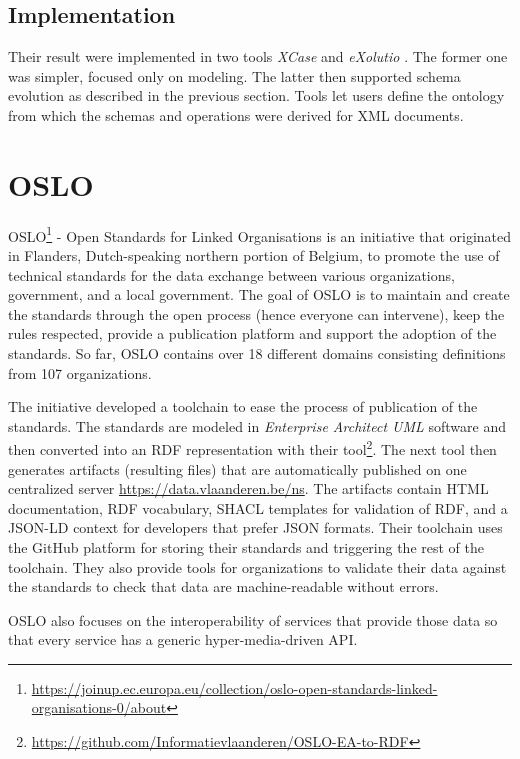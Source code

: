 \subsection{Implementation}

Their result were implemented in two tools \textit{XCase} \cite{xcase} and \textit{eXolutio} \cite{exolutio}. The former one was simpler, focused only on modeling. The latter then supported schema evolution as described in the previous section. Tools let users define the ontology from which the schemas and operations were derived for XML documents.

\section{OSLO}

OSLO\footnote{\url{https://joinup.ec.europa.eu/collection/oslo-open-standards-linked-organisations-0/about}} - Open Standards for Linked Organisations is an initiative that originated in Flanders, Dutch-speaking northern portion of Belgium, to promote the use of technical standards for the data exchange between various organizations, government, and a local government. The goal of OSLO is to maintain and create the standards through the open process (hence everyone can intervene), keep the rules respected, provide a publication platform and support the adoption of the standards. So far, OSLO contains over 18 different domains consisting definitions from 107 organizations.

The initiative developed a toolchain to ease the process of publication of the standards. The standards are modeled in \textit{Enterprise Architect UML} software and then converted into an RDF representation with their tool\footnote{\url{https://github.com/Informatievlaanderen/OSLO-EA-to-RDF}}. The next tool then generates artifacts (resulting files) that are automatically published on one centralized server \url{https://data.vlaanderen.be/ns}. The artifacts contain HTML documentation, RDF vocabulary, SHACL templates for validation of RDF, and a JSON-LD context for developers that prefer JSON formats. Their toolchain uses the GitHub platform for storing their standards and triggering the rest of the toolchain. They also provide tools for organizations to validate their data against the standards to check that data are machine-readable without errors.

OSLO also focuses on the interoperability of services that provide those data so that every service has a generic hyper-media-driven API.

